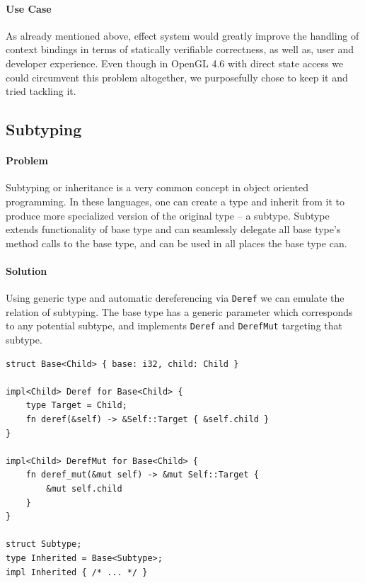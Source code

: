\paragraph{Use Case}

As already mentioned above, effect system would greatly improve the handling of context bindings in terms of statically verifiable correctness, as well as, user and developer experience.
Even though in OpenGL 4.6 with direct state access we could circumvent this problem altogether, we purposefully chose to keep it and tried tackling it.

\subsection{Subtyping}

\paragraph{Problem}

Subtyping or inheritance is a very common concept in object oriented programming. 
In these languages, one can create a type and inherit from it to produce more specialized version of the original type -- a subtype.
Subtype extends functionality of base type and can seamlessly delegate all base type's method calls to the base type, and can be used in all places the base type can.

\paragraph{Solution}

Using generic type and automatic dereferencing via \texttt{Deref} we can emulate the relation of subtyping.
The base type has a generic parameter which corresponds to any potential subtype, and implements \texttt{Deref} and \texttt{DerefMut} targeting that subtype.

\begin{lstlisting}
struct Base<Child> { base: i32, child: Child }

impl<Child> Deref for Base<Child> {
    type Target = Child;
    fn deref(&self) -> &Self::Target { &self.child }
}

impl<Child> DerefMut for Base<Child> {
    fn deref_mut(&mut self) -> &mut Self::Target {
        &mut self.child
    }
}

struct Subtype;
type Inherited = Base<Subtype>;
impl Inherited { /* ... */ }
\end{lstlisting}

